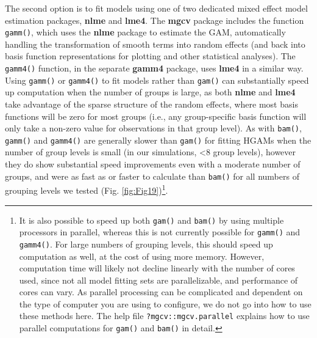 \documentclass[12pt]{article}
\let\rmarkdownfootnote\footnote%
\def\footnote{\protect\rmarkdownfootnote}
\begin{document}
The second option is to fit models using one of two dedicated mixed
effect model estimation packages, \textbf{nlme} and \textbf{lme4}. The
\textbf{mgcv} package includes the function \texttt{gamm()}, which uses
the \textbf{nlme} package to estimate the GAM, automatically handling
the transformation of smooth terms into random effects (and back into
basis function representations for plotting and other statistical
analyses). The \texttt{gamm4()} function, in the separate \textbf{gamm4}
package, uses \textbf{lme4} in a similar way. Using \texttt{gamm()} or
\texttt{gamm4()} to fit models rather than \texttt{gam()} can
substantially speed up computation when the number of groups is large,
as both \textbf{nlme} and \textbf{lme4} take advantage of the sparse
structure of the random effects, where most basis functions will be zero
for most groups (i.e., any group-specific basis function will only take
a non-zero value for observations in that group level). As with
\texttt{bam()}, \texttt{gamm()} and \texttt{gamm4()} are generally
slower than \texttt{gam()} for fitting HGAMs when the number of group
levels is small (in our simulations, \textless{}8 group levels), however
they do show substantial speed improvements even with a moderate number
of groups, and were as fast as or faster to calculate than
\texttt{bam()} for all numbers of grouping levels we tested (Fig.
\ref{fig:Fig19})\footnote{It is also possible to speed up both
  \texttt{gam()} and \texttt{bam()} by using multiple processors in
  parallel, whereas this is not currently possible for \texttt{gamm()}
  and \texttt{gamm4()}. For large numbers of grouping levels, this
  should speed up computation as well, at the cost of using more memory.
  However, computation time will likely not decline linearly with the
  number of cores used, since not all model fitting sets are
  parallelizable, and performance of cores can vary. As parallel
  processing can be complicated and dependent on the type of computer
  you are using to configure, we do not go into how to use these methods
  here. The help file \texttt{?mgcv::mgcv.parallel} explains how to use
  parallel computations for \texttt{gam()} and \texttt{bam()} in detail.}.
\end{document}
